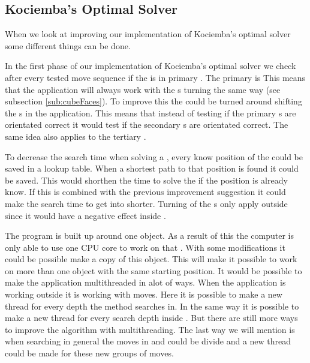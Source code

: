 \subsection{Kociemba's Optimal Solver}
When we look at improving our implementation of Kociemba's optimal solver some different things can be done.
	
In the first phase of our implementation of Kociemba's optimal solver we check after every tested move sequence if the \cube{} is in primary . The primary  is 
This means that the application will always work with the \face{}s turning the same way (see subsection \ref{sub:cubeFaces}).
To improve this the \rubik{} could be turned around shifting the \face{}s in the application.
This means that instead of testing if the primary \face{} \cubie{}s are orientated correct it would test if the secondary \face{} \cubie{}s are orientated correct. 
The same idea also applies to the tertiary \face{}.
	
To decrease the search time when solving a \rubik{}, every know position of the \rubik{} could be saved in a lookup table.
When a shortest path to that position is found it could be saved.
This would shorthen the time to solve the \rubik{} if the position is already know.
If this is combined with the previous improvement suggestion it could make the search time to get into  shorter.
Turning of the \face{}s only apply outside  since it would have a negative effect inside . 
	 
The program is built up around one \cube{} object.
As a result of this the computer is only able to use one CPU core to work on that \cube{}.
With some modifications it could be possible make a copy of this \cube{} object.
This will make it possible to work on more than one \cube{} object with the same starting position.
It would be possible to make the application multithreaded in alot of ways.
When the application is working outside  it is working with  moves.
Here it is possible to make a new thread for every depth the method searches in.
In the same way it is possible to make a new thread for every search depth inside .
But there are still more ways to improve the algorithm with multithreading.
The last way we will mention is when searching in general the moves in  and  could be divide and a new thread could be made for these new groups of moves.